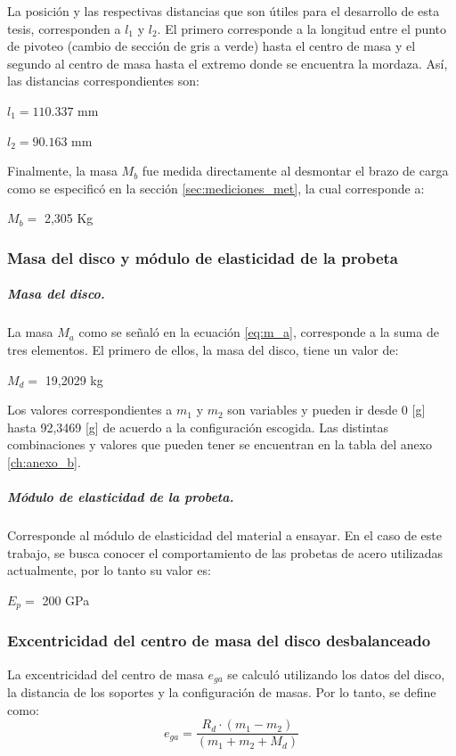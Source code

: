 La posición y las respectivas distancias que son útiles para el desarrollo de esta tesis, corresponden a $l_1$ y $l_2$. El primero corresponde a la longitud entre el punto de pivoteo (cambio de sección de gris a verde) hasta el centro de masa y el segundo al centro de masa hasta el extremo donde se encuentra la mordaza.   Así, las distancias correspondientes son:
\begin{itemize*}
	\item $l_1= 110.337$ mm
	\item $l_2= 90.163$ mm
\end{itemize*}

Finalmente, la masa $M_b$ fue medida directamente al desmontar el brazo de carga como se especificó en la sección \ref{sec:mediciones_met}, la cual corresponde a:
\begin{itemize*}
	\item $M_b=$ 2,305 Kg
\end{itemize*}

\subsubsection{Masa del disco y módulo de elasticidad de la probeta}

\subparagraph{\textit{Masa del disco}.}
La masa $M_a$ como se señaló en la ecuación \ref{eq:m_a}, corresponde a la suma de tres elementos. El primero de ellos, la masa del disco, tiene un valor de:
\begin{itemize*}
	\item $M_d=$ 19,2029 kg
\end{itemize*}
Los valores correspondientes a $m_1$ y $m_2$ son variables y pueden ir desde 0 [g] hasta 92,3469 [g] de acuerdo a la configuración escogida. Las distintas combinaciones y valores que pueden tener se encuentran en la tabla del anexo \ref{ch:anexo_b}.
\subparagraph{\textit{Módulo de elasticidad de la probeta}.}
Corresponde al módulo de elasticidad del material a ensayar. En el caso de este trabajo, se busca conocer el comportamiento de las probetas de acero utilizadas actualmente, por lo tanto su valor es:
\begin{itemize*}
	\item $E_p=$ 200 GPa
\end{itemize*}
\subsubsection{Excentricidad del centro de masa del disco desbalanceado}
La excentricidad del centro de masa $e_{ga}$ se calculó utilizando los datos del disco, la distancia de los soportes y la configuración de masas. Por lo tanto, se define como:
\begin{equation}
	e_{ga} = \frac{R_d\cdot (m_1 - m_2)}{(m_1 + m_2 + M_d)}
\end{equation}
